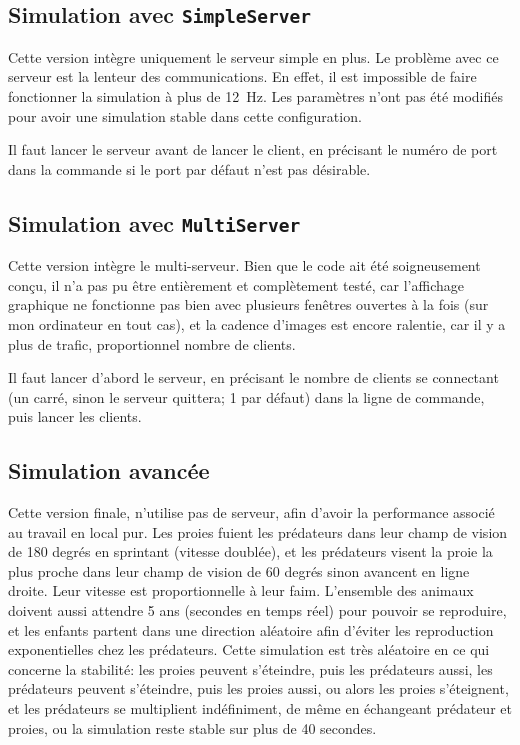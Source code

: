 \documentclass[12pt,a4paper,titlepage]{article}
\begin{document}
\subsection{Simulation avec \texttt{SimpleServer}}

Cette version intègre uniquement le serveur simple en plus. Le problème avec ce serveur est la lenteur des communications. En effet, il est impossible de faire fonctionner la simulation à plus de 12~Hz. Les paramètres n'ont pas été modifiés pour avoir une simulation stable dans cette configuration.

Il faut lancer le serveur avant de lancer le client, en précisant le numéro de port dans la commande si le port par défaut n'est pas désirable.

\subsection{Simulation avec \texttt{MultiServer}}

Cette version intègre le multi-serveur. Bien que le code ait été soigneusement conçu, il n'a pas pu être entièrement et complètement testé, car l'affichage graphique ne fonctionne pas bien avec plusieurs fenêtres ouvertes à la fois (sur mon ordinateur en tout cas), et la cadence d'images est encore ralentie, car il y a plus de trafic, proportionnel nombre de clients.

Il faut lancer d'abord le serveur, en précisant le nombre de clients se connectant (un carré, sinon le serveur quittera; 1 par défaut) dans la ligne de commande, puis lancer les clients.

\subsection{Simulation avancée}

Cette version finale, n'utilise pas de serveur, afin d'avoir la performance associé au travail en local pur. 
Les proies fuient les prédateurs dans leur champ de vision de 180 degrés en sprintant (vitesse doublée), et les prédateurs visent la proie la plus proche dans leur champ de vision de 60 degrés sinon avancent en ligne droite. Leur vitesse est proportionnelle à leur faim. L'ensemble des animaux doivent aussi attendre 5 ans (secondes en temps réel) pour pouvoir se reproduire, et les enfants partent dans une direction aléatoire afin d'éviter les reproduction exponentielles chez les prédateurs. Cette simulation est très aléatoire en ce qui concerne la stabilité: les proies peuvent s'éteindre, puis les prédateurs aussi, les prédateurs peuvent s'éteindre, puis les proies aussi, ou alors les proies s'éteignent, et les prédateurs se multiplient indéfiniment, de même en échangeant prédateur et proies, ou la simulation reste stable sur plus de 40 secondes.
\end{document}
